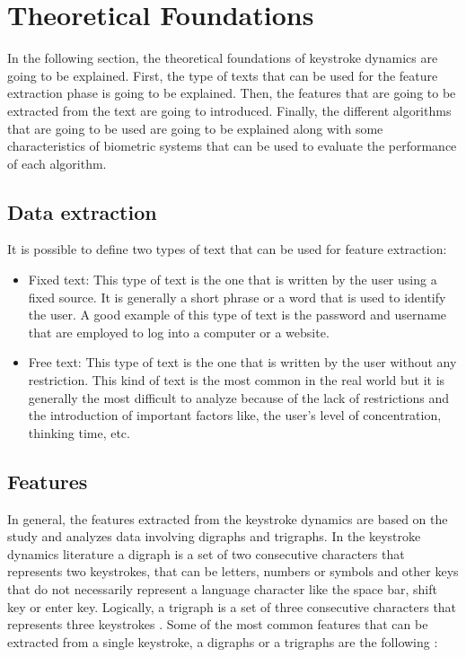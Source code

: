 \section{Theoretical Foundations}

In the following section, the theoretical foundations of keystroke dynamics are going to be explained. First, the type of texts that can be used for the feature extraction phase is going to be explained. Then, the features that are going to be extracted from the text are going to introduced. Finally, the different algorithms that are going to be used are going to be explained along with some characteristics of biometric systems that can be used to evaluate the performance of each algorithm.

\subsection{Data extraction}

It is possible to define two types of text that can be used for feature extraction:

\begin{itemize}
	\item Fixed text: This type of text is the one that is written by the user using a fixed source. It is generally a short phrase or a word that is used to identify the user. A good example of this type of text is the password and username that are employed to log into a computer or a website.

	\item Free text: This type of text is the one that is written by the user without any restriction. This kind of text is the most common in the real world but it is generally the most difficult to analyze because of the lack of restrictions and the introduction of important factors like, the user's level of concentration, thinking time, etc.
\end{itemize}



\subsection{Features}

In general, the features extracted from the keystroke dynamics are based on the study and analyzes data involving digraphs and trigraphs. In the keystroke dynamics literature a digraph is a set of two consecutive characters that represents two keystrokes, that can be letters, numbers or symbols and other keys that do not necessarily represent a language character like the space bar, shift key or enter key. Logically, a trigraph is a set of three consecutive characters that represents three keystrokes \cite{trigraphs}. Some of the most common features that can be extracted from a single keystroke, a digraphs or a trigraphs are the following \cite{monrose2000keystroke, machine_learning}:

